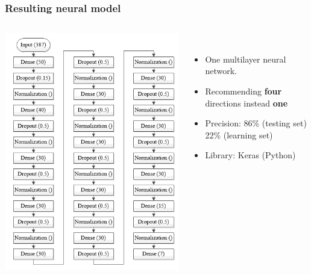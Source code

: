 \documentclass[10pt,dvipsnames]{beamer}
\begin{document}
\begin{frame}
  \frametitle{Resulting neural model}
  \begin{columns}
    \begin{column}{0.5\linewidth}
      \includegraphics[width=\linewidth]{pics/algo.png}
    \end{column}
    \begin{column}{0.5\linewidth}
      \
      \begin{itemize}
      \item One multilayer neural network.
      \item Recommending \textbf{four} directions instead \textbf{one}
      \item Precision: 86\% (testing set) 22\% (learning set)
        \item Library: Keras (Python)
      \end{itemize}
      \vspace{2em}

\end{column}
\end{columns}
\end{frame}
\end{document}
